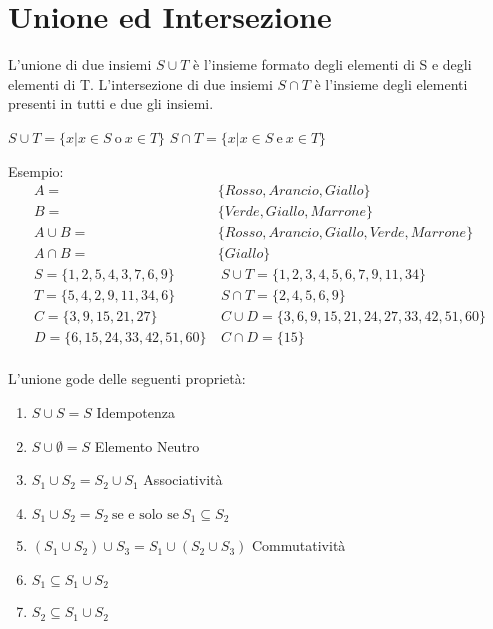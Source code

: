 \section{Unione ed Intersezione}
L'unione di due insiemi $S \cup T$ è l'insieme formato degli elementi di S e degli
elementi di T.\newline
L'intersezione di due insiemi $S \cap T$ è l'insieme degli elementi presenti in
tutti e due gli insiemi.

$S \cup T = \{x | x \in S \ \text{o} \ x \in T \} $ \newline
$S \cap T = \{x | x \in S \ \text{e} \ x \in T \} $

Esempio:
\begin{align*}
A = & \{Rosso,Arancio,Giallo \} \\
B = & \{Verde,Giallo,Marrone \} \\
A \cup B = & \{Rosso,Arancio,Giallo,Verde,Marrone \} \\
A \cap B = & \{Giallo \} \\
S = \{1,2,5,4,3,7,6,9\}  & \ S \cup T = \{1,2,3,4,5,6,7,9,11,34\} \\
T = \{5,4,2,9,11,34,6\}  & \ S \cap T = \{2,4,5,6,9\} \\
C = \{3,9,15,21,27\}  & \ C \cup D = \{3,6,9,15,21,24,27,33,42,51,60\} \\
D = \{6,15,24,33,42,51,60\} & \ C \cap D = \{15\}\\
\end{align*}

\begin{prop}
    L'unione gode delle seguenti proprietà:
\end{prop}
\begin{enumerate}
\item $S \cup S = S$ \quad Idempotenza
\item $S \cup \emptyset = S$ \quad Elemento Neutro
\item $S_1 \cup S_2 = S_2 \cup S_1$ \quad Associatività
\item $S_1 \cup S_2 = S_2 \ \text{se e solo se} \ S_1 \subseteq S_2$
\item $(S_1 \cup S_2) \cup S_3 = S_1 \cup (S_2 \cup S_3)$ \quad Commutatività
\item $S_1 \subseteq S_1 \cup S_2$
\item $S_2 \subseteq S_1 \cup S_2$
\end{enumerate}

